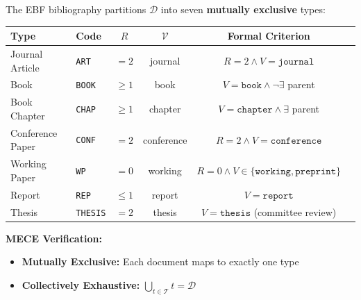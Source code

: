 \begin{tcolorbox}[colback=blue!5!white, colframe=blue!75!black,
    title=\textbf{Definition 0a: Canonical Publication Types (MECE Partition)}]

The EBF bibliography partitions $\mathcal{D}$ into seven \textbf{mutually exclusive} types:

\begin{table}[H]
\centering
\begin{tabular}{@{}llcccp{4cm}@{}}
\toprule
\textbf{Type} & \textbf{Code} & $R$ & $\mathcal{V}$ & \textbf{Formal Criterion} \\
\midrule
Journal Article & \texttt{ART} & $=2$ & journal & $R=2 \land V=\texttt{journal}$ \\
Book & \texttt{BOOK} & $\geq 1$ & book & $V=\texttt{book} \land \neg\exists$ parent \\
Book Chapter & \texttt{CHAP} & $\geq 1$ & chapter & $V=\texttt{chapter} \land \exists$ parent \\
Conference Paper & \texttt{CONF} & $=2$ & conference & $R=2 \land V=\texttt{conference}$ \\
Working Paper & \texttt{WP} & $=0$ & working & $R=0 \land V \in \{\texttt{working}, \texttt{preprint}\}$ \\
Report & \texttt{REP} & $\leq 1$ & report & $V=\texttt{report}$ \\
Thesis & \texttt{THESIS} & $=2$ & thesis & $V=\texttt{thesis}$ (committee review) \\
\bottomrule
\end{tabular}
\end{table}

\textbf{MECE Verification:}
\begin{itemize}[nosep]
    \item \textbf{Mutually Exclusive:} Each document maps to exactly one type
    \item \textbf{Collectively Exhaustive:} $\bigcup_{t \in \mathcal{T}} t = \mathcal{D}$
\end{itemize}

\end{tcolorbox}

